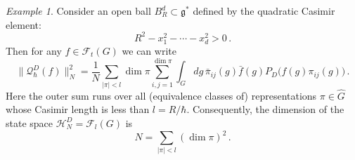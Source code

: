 \documentclass[12pt,a4paper]{article}
\numberwithin{equation}{section}
\theoremstyle{theorem}
\theoremstyle{remark}
\newtheorem{example}[equation]{Example}
\newcommand{\hh}{\mathcal{H}}
\newcommand{\gs}{\mathfrak{g}^\ast}
\newcommand{\qq}{\mathcal{Q}_{\hbar}}
\newcommand{\ff}{\mathcal{F}}
\begin{document}
\begin{example}
    Consider an open  ball $B^d_R\subset\gs$ defined by the quadratic Casimir element:
    \begin{equation}
        R^2-x_1^2-\cdots -x_d^2>0\,.
    \end{equation}
   Then for any $f\in \ff_t(G)$ we can write
    \begin{equation}\label{sum}
        \|\qq^{D}(f)\|^2_N=\frac1N\sum_{|\pi|<l}\dim \pi\sum_{i,j=1}^{\dim \pi}\int_Gdg\,\bar \pi_{ij}(g)\bar f(g)P_D \big(f(g)\pi_{ij}(g)\big)\,.
    \end{equation}
    Here the outer sum runs over all (equivalence classes of) representations $\pi\in \hat{G}$ whose Casimir length is less than $l=R/\hbar$. Consequently, the dimension of the state space $\hh_N^D=\ff_l(G)$ is  
    \begin{equation}\label{NN}
        N=\sum_{|\pi|<l}(\dim \pi)^2 \,.
        \end{equation}


\end{example}
\end{document}
